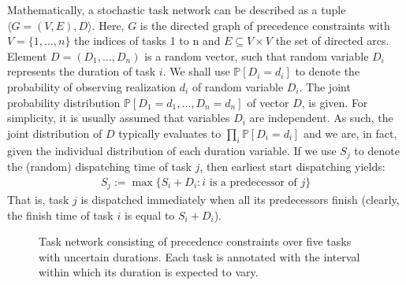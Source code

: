 	Mathematically, a stochastic task network can be described as a tuple $\langle G=(V,E), D \rangle$.
	Here, $G$ is the directed graph of precedence constraints with $V=\{1,\ldots,n\}$ the indices of tasks 1 to n and $E \subseteq V\times V$ the set of directed arcs.
	Element $D=(D_1,\ldots,D_n)$ is a random vector, such that random variable $D_i$ represents the duration of task $i$.
	We shall use $\mathbb{P}[D_i = d_i]$ to denote the probability of observing realization $d_i$ of random variable $D_i$.
	The joint probability distribution $\mathbb{P}[D_1=d_1, \ldots, D_n=d_n]$ of vector $D$, is given.
	For simplicity, it is usually assumed that variables $D_i$ are independent.
	As such, the joint distribution of $D$ typically evaluates to $\prod_{i} \mathbb{P}[D_i=d_i]$ and we are, in fact, 
	given the individual distribution of each duration variable. 
	If we use $S_j$ to denote the (random) dispatching time of task $j$,
	then earliest start dispatching yields:
	\begin{align}
		S_j := \max \{S_i + D_i : i \textrm{ is a predecessor of } j\} \label{chapter:prelim-2:sj}
	\end{align}
	That is, task $j$ is dispatched immediately when all its predecessors finish (clearly, the finish time of task $i$ is equal to $S_i + D_i$).

	\begin{figure}
		\centering
		\caption{Task network consisting of precedence constraints over five tasks with uncertain durations.
		Each task is annotated with the interval within which its duration is expected to vary.}
		\label{chapter:prelim-2:example-1}
	\end{figure}


